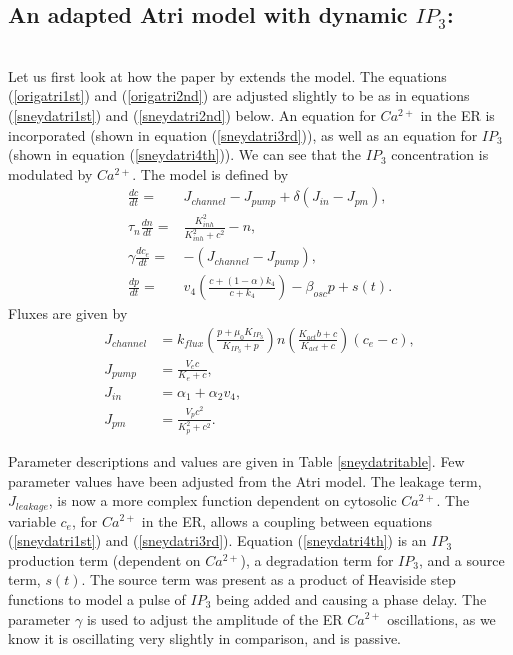 \subsection*{An adapted Atri model with dynamic $IP_3$:}\\
Let us first look at how the paper by  extends the  model. The equations (\ref{origatri1st}) and (\ref{origatri2nd}) are adjusted slightly to be as in equations (\ref{sneydatri1st}) and (\ref{sneydatri2nd}) below. An equation for $Ca^{2+}$ in the ER is incorporated (shown in equation (\ref{sneydatri3rd})), as well as an equation for $IP_3$ (shown in equation (\ref{sneydatri4th})). We can see that the $IP_3$ concentration is modulated by $Ca^{2+}$. The model is defined by
\begin{align}
    \frac{dc}{dt}=& J_{channel}- J_{pump}+\delta (J_{in}- J_{pm}),\label{sneydatri1st}\\
    \tau_n\frac{dn}{dt} =& \frac{K_{inh}^2}{K_{inh}^2+c^2} -n,\label{sneydatri2nd}\\
    \gamma \frac{dc_e}{dt}=& -(J_{channel}- J_{pump}),\label{sneydatri3rd}\\
    \frac{dp}{dt}=&v_4\left(\frac{c+(1-\alpha)k_4}{c+k_4}\right)-\beta _{osc}p+s(t).\label{sneydatri4th}
\end{align}
Fluxes are given by
\begin{align}\nonumber
    J_{channel}&=k_{flux}\left(\frac{p+\mu_0K_{IP_3}}{K_{IP_3}+p}\right)n\left(\frac{K_{act}b+c}{K_{act}+c}\right)(c_e-c),\\
    J_{pump}&=\frac{V_e c}{K_e+c},\nonumber\\
    J_{in}&=\alpha_1+\alpha_2v_4,\nonumber\\
    J_{pm}&=\frac{V_pc^2}{K_p^2+c^2}.\nonumber
\end{align}


Parameter descriptions and values are given in Table \ref{sneydatritable}. Few parameter values have been adjusted from the Atri model. The leakage term, $J_{leakage}$, is now a more complex function dependent on cytosolic $Ca^{2+}$. The variable $c_e$, for $Ca^{2+}$ in the ER, allows a coupling between equations (\ref{sneydatri1st}) and (\ref{sneydatri3rd}). Equation (\ref{sneydatri4th}) is an $IP_3$ production term (dependent on $Ca^{2+}$), a degradation term for $IP_3$, and a source term, $s(t)$. The source term was present as a product of Heaviside step functions to model a pulse of $IP_3$ being added and causing a phase delay. The parameter $\gamma$ is used to adjust the amplitude of the ER $Ca^{2+}$ oscillations, as we know it is oscillating very slightly in comparison, and is passive.

